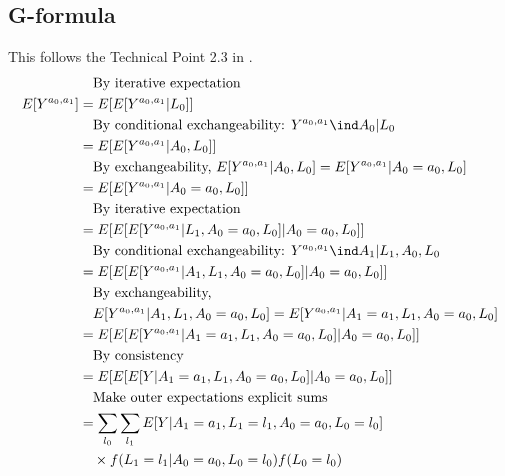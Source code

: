 \documentclass[dvipdfmx,10pt]{article}
\begin{document}
\subsection{G-formula}
\label{sec:org1596dff}
This follows the Technical Point 2.3 in \cite{hernanCausalInference2019}.
\begin{align*}
  &~~~\text{By iterative expectation}\\
  E[Y^{a_{0},a_{1}}]
  &= E[E[Y^{a_{0},a_{1}} | L_{0}]]\\
  &~~~\text{By conditional exchangeability: } Y^{a_{0},a_{1}} \ind A_{0} | L_{0}\\
  &= E[E[Y^{a_{0},a_{1}} | A_{0}, L_{0}]]\\
  &~~~\text{By exchangeability, }E[Y^{a_{0},a_{1}} | A_{0}, L_{0}] = E[Y^{a_{0},a_{1}} | A_{0} = a_{0}, L_{0}]\\
  &= E[E[Y^{a_{0},a_{1}} | A_{0} = a_{0}, L_{0}]]\\
  &~~~\text{By iterative expectation}\\
  &= E[E[ E[Y^{a_{0},a_{1}} | L_{1}, A_{0} = a_{0}, L_{0}] | A_{0} = a_{0}, L_{0}]]\\
  &~~~\text{By conditional exchangeability: } Y^{a_{0},a_{1}} \ind A_{1} | L_{1},A_{0},L_{0}\\
  &= E[E[ E[Y^{a_{0},a_{1}} | A_{1}, L_{1}, A_{0} = a_{0}, L_{0}] | A_{0} = a_{0}, L_{0}]]\\
  &~~~\text{By exchangeability, }\\
  &~~~E[Y^{a_{0},a_{1}} | A_{1}, L_{1}, A_{0} = a_{0}, L_{0}] = E[Y^{a_{0},a_{1}} | A_{1} = a_{1}, L_{1}, A_{0} = a_{0}, L_{0}]\\
  &= E[E[ E[Y^{a_{0},a_{1}} | A_{1} = a_{1}, L_{1}, A_{0} = a_{0}, L_{0}] | A_{0} = a_{0}, L_{0}]]\\
  &~~~\text{By consistency}\\
  &= E[E[ E[Y | A_{1} = a_{1}, L_{1}, A_{0} = a_{0}, L_{0}] | A_{0} = a_{0}, L_{0}]]\\
  &~~~\text{Make outer expectations explicit sums}\\
  &= \sum_{l_{0}} \sum_{l_{1}}
    E[Y | A_{1} = a_{1}, L_{1} = l_{1}, A_{0} = a_{0}, L_{0} = l_{0}]\\
  &~~~\times f(L_{1} = l_{1} | A_{0} = a_{0}, L_{0} = l_{0}) f(L_{0} = l_{0})\\
\end{align*}
\end{document}
